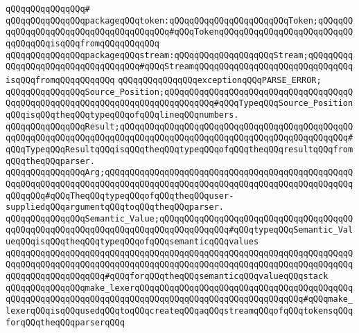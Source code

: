 \verb|qQQqqQQqqQQqqQQq#|\newline
\verb|qQQqqQQqqQQqqQQqpackageqQQqtoken:qQQqqQQqqQQqqQQqqQQqqQQqToken;qQQqqQQqqQQqqQQqqQQqqQQqqQQqqQQqqQQqqQQq#qQQqTokenqQQqqQQqqQQqqQQqqQQqqQQqqQQqqQQqqQQqisqQQqfromqQQqqQQqqQQq|\newline
\verb|qQQqqQQqqQQqqQQqpackageqQQqstream:qQQqqQQqqQQqqQQqqQQqStream;qQQqqQQqqQQqqQQqqQQqqQQqqQQqqQQqqQQq#qQQqStreamqQQqqQQqqQQqqQQqqQQqqQQqqQQqqQQqisqQQqfromqQQqqQQqqQQq|\newline
\newline
\verb|qQQqqQQqqQQqqQQqexceptionqQQqPARSE_ERROR;|\newline
\newline
\verb|qQQqqQQqqQQqqQQqSource_Position;qQQqqQQqqQQqqQQqqQQqqQQqqQQqqQQqqQQqqQQqqQQqqQQqqQQqqQQqqQQqqQQqqQQqqQQqqQQqqQQq#qQQqTypeqQQqSource_PositionqQQqisqQQqtheqQQqtypeqQQqofqQQqlineqQQqnumbers.|\newline
\verb|qQQqqQQqqQQqqQQqResult;qQQqqQQqqQQqqQQqqQQqqQQqqQQqqQQqqQQqqQQqqQQqqQQqqQQqqQQqqQQqqQQqqQQqqQQqqQQqqQQqqQQqqQQqqQQqqQQqqQQqqQQqqQQqqQQqqQQq#qQQqTypeqQQqResultqQQqisqQQqtheqQQqtypeqQQqofqQQqtheqQQqresultqQQqfromqQQqtheqQQqparser.|\newline
\verb|qQQqqQQqqQQqqQQqArg;qQQqqQQqqQQqqQQqqQQqqQQqqQQqqQQqqQQqqQQqqQQqqQQqqQQqqQQqqQQqqQQqqQQqqQQqqQQqqQQqqQQqqQQqqQQqqQQqqQQqqQQqqQQqqQQqqQQqqQQqqQQqqQQq#qQQqTheqQQqtypeqQQqofqQQqtheqQQquser-suppliedqQQqargumentqQQqtoqQQqtheqQQqparser.|\newline
\newline
\newline
\verb|qQQqqQQqqQQqqQQqSemantic_Value;qQQqqQQqqQQqqQQqqQQqqQQqqQQqqQQqqQQqqQQqqQQqqQQqqQQqqQQqqQQqqQQqqQQqqQQqqQQqqQQqqQQq#qQQqtypeqQQqSemantic_ValueqQQqisqQQqtheqQQqtypeqQQqofqQQqsemanticqQQqvalues|\newline
\verb|qQQqqQQqqQQqqQQqqQQqqQQqqQQqqQQqqQQqqQQqqQQqqQQqqQQqqQQqqQQqqQQqqQQqqQQqqQQqqQQqqQQqqQQqqQQqqQQqqQQqqQQqqQQqqQQqqQQqqQQqqQQqqQQqqQQqqQQqqQQqqQQqqQQqqQQqqQQqqQQq#qQQqforqQQqtheqQQqsemanticqQQqvalueqQQqstack|\newline
\newline
\verb|qQQqqQQqqQQqqQQqmake_lexerqQQqqQQqqQQqqQQqqQQqqQQqqQQqqQQqqQQqqQQqqQQqqQQqqQQqqQQqqQQqqQQqqQQqqQQqqQQqqQQqqQQqqQQqqQQqqQQqqQQqqQQq#qQQqmake_lexerqQQqisqQQqusedqQQqtoqQQqcreateqQQqaqQQqstreamqQQqofqQQqtokensqQQqforqQQqtheqQQqparserqQQq|\newline
